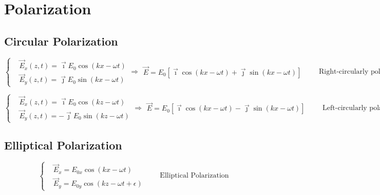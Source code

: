 \chapter{Polarization}

\section{Circular Polarization}

\begin{equation*}
  \left\{
    \begin{aligned}
      & \vec{E}_x \left( z,t \right) = \vec{\imath} E_0 \cos \left( k x - \omega t \right) \\
      & \vec{E}_y \left( z,t \right) = \vec{\jmath} E_0 \sin \left( k x - \omega t \right)
    \end{aligned}
  \right.
  \Rightarrow 
  \begin{aligned}
    \vec{E} = E_0 \left[ \vec{\imath} \cos \left( k x - \omega t \right) + \vec{\jmath} \sin \left( k x - \omega t \right) \right]
  \end{aligned}
  \quad\quad \text{Right-circularly polarized}
\end{equation*}

\begin{equation*}
  \left\{
    \begin{aligned}
      & \vec{E}_x \left( z,t \right) = \vec{\imath} E_0 \cos \left( k z - \omega t \right) \\
      & \vec{E}_y \left( z,t \right) = - \vec{\jmath} E_0 \sin \left( k z - \omega t \right)
    \end{aligned}
  \right.
  \Rightarrow 
  \begin{aligned}
    \vec{E} = E_0 \left[ \vec{\imath} \cos \left( k x - \omega t \right) - \vec{\jmath} \sin \left( k x - \omega t \right) \right]
  \end{aligned}
  \quad\quad \text{Left-circularly polarized}
\end{equation*}

\section{Elliptical Polarization}

\begin{equation*}
  \left\{
    \begin{aligned}
      & \vec{E}_x = E_{0x} \cos \left( k x - \omega t \right) \\
      & \vec{E}_y = E_{0y} \cos \left( k z - \omega t + \epsilon \right)
    \end{aligned}
  \right.
  \quad\quad \text{Elliptical Polarization}
\end{equation*}

